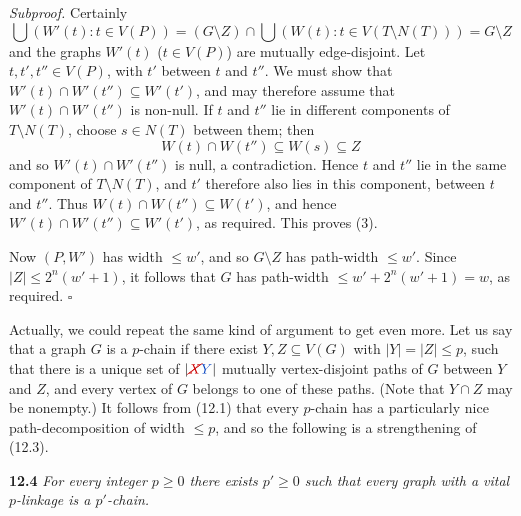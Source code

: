 \textit{Subproof.} Certainly
\begin{equation*}
\bigcup(W'(t) : t \in V(P)) = (G \setminus Z) \cap \bigcup(W(t) : t \in V(T \setminus N(T))) = G \setminus Z
\end{equation*}
and the graphs $W'(t)$ ($t \in V(P)$) are mutually edge-disjoint. Let $t, t', t'' \in V(P)$, with $t'$ between $t$ and $t''$. We must show that $W'(t) \cap W'(t'') \subseteq W'(t')$, and may therefore assume that $W'(t) \cap W'(t'')$ is non-null. If $t$ and $t''$ lie in different components of $T \setminus N(T)$, choose $s \in N(T)$ between them; then
\begin{equation*}
W(t) \cap W(t'') \subseteq W(s) \subseteq Z
\end{equation*}
and so $W'(t) \cap W'(t'')$ is null, a contradiction. Hence $t$ and $t''$ lie in the same component of $T \setminus N(T)$, and $t'$ therefore also lies in this component, between $t$ and $t''$. Thus $W(t) \cap W(t'') \subseteq W(t')$, and hence $W'(t) \cap W'(t'') \subseteq W'(t')$, as required. This proves (3).

Now $(P, W')$ has width $\le w'$, and so $G \setminus Z$ has path-width $\le w'$. Since $|Z| \le 2^n(w' + 1)$, it follows that $G$ has path-width $\le w' + 2^n(w' + 1) = w$, as required. $\square$

Actually, we could repeat the same kind of argument to get even more. Let us say that a graph $G$ is a $p$-chain if there exist $Y, Z \subseteq V(G)$ with $|Y| = |Z| \le p$, such that there is a unique set of $|\delm{X}\fix{Y}|$ mutually vertex-disjoint paths of $G$ between $Y$ and $Z$, and every vertex of $G$ belongs to one of these paths. (Note that $Y \cap Z$ may be nonempty.) It follows from (12.1) that every $p$-chain has a particularly nice path-decomposition of width $\le p$, and so the following is a strengthening of (12.3).

\textbf{12.4} \textit{For every integer $p \ge 0$ there exists $p' \ge 0$ such that every graph with a vital $p$-linkage is a $p'$-chain.}

